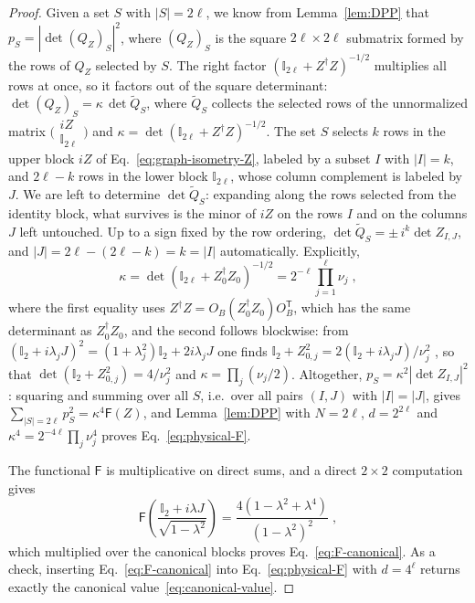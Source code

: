 \documentclass[prx,twocolumn,superscriptaddress,aps,10pt, frontmatterverbose, reprint,footinbib,longbibliography=true]{revtex4-2}
\newcommand{\trans}{\mathsf{T}}
\begin{document}
\begin{proof}
Given a set $S$ with $|S|=2\ell$, we know from Lemma~\ref{lem:DPP} that $p_S=|\det(Q_Z)_S|^2$, where $(Q_Z)_S$ is the square $2\ell\times2\ell$ submatrix formed by the rows of $Q_Z$ selected by $S$. The right factor $(\mathbb{I}_{2\ell}+Z^\dagger Z)^{-1/2}$ multiplies all rows at once, so it factors out of the square determinant: $\det(Q_Z)_S=\kappa\,\det\widetilde{Q}_S$, where $\widetilde{Q}_S$ collects the selected rows of the unnormalized matrix $\big(\begin{smallmatrix}iZ\\ \mathbb{I}_{2\ell}\end{smallmatrix}\big)$ and $\kappa=\det(\mathbb{I}_{2\ell}+Z^\dagger Z)^{-1/2}$. 
The set $S$ selects $k$ rows in the upper block $iZ$ of Eq.~\eqref{eq:graph-isometry-Z}, labeled by a subset $I$ with $|I|=k$, and $2\ell-k$ rows in the lower block $\mathbb{I}_{2\ell}$, whose column complement is labeled by $J$.
We are left to determine $\det\widetilde{Q}_S$: expanding along the rows selected from the identity block, what survives is the minor of $iZ$ on the rows $I$ and on the columns $J$ left untouched. Up to a sign fixed by the row ordering, $\det\widetilde{Q}_S=\pm\,i^k\det Z_{I,J}$, and $|J|=2\ell-(2\ell-k)=k=|I|$ automatically. Explicitly,
\begin{equation}
    \kappa=\det\!\left(\mathbb{I}_{2\ell}+Z_0^\dagger Z_0\right)^{-1/2}=2^{-\ell}\prod_{j=1}^{\ell}\nu_j\;,
    \label{eq:kappa}
\end{equation}
where the first equality uses $Z^\dagger Z=O_B(Z_0^\dagger Z_0)O_B^{\trans}$, which has the same determinant as $Z_0^\dagger Z_0$, and the second follows blockwise: from $(\mathbb{I}_2+i\lambda_jJ)^2=(1+\lambda_j^2)\mathbb{I}_2+2i\lambda_jJ$ one finds $\mathbb{I}_2+Z_{0,j}^2=2(\mathbb{I}_2+i\lambda_jJ)/\nu_j^2$ , so that $\det(\mathbb{I}_2+Z_{0,j}^2)=4/\nu_j^2$ and $\kappa=\prod_{j}(\nu_j/2)$. Altogether, $p_S=\kappa^2|\det Z_{I,J}|^2$: squaring and summing over all $S$, i.e.\ over all pairs $(I,J)$ with $|I|=|J|$, gives $\sum_{|S|=2\ell}p_S^2=\kappa^4\mathsf{F}(Z)$, and Lemma~\ref{lem:DPP} with $N=2\ell$, $d=2^{2\ell}$ and $\kappa^4=2^{-4\ell}\prod_j\nu_j^4$ proves Eq.~\eqref{eq:physical-F}.

The functional $\mathsf{F}$ is multiplicative on direct sums, and a direct $2\times2$ computation gives
\begin{equation}
    \mathsf{F}\!\left(\frac{\mathbb{I}_2+i\lambda J}{\sqrt{1-\lambda^2}}\right)=\frac{4\left(1-\lambda^2+\lambda^4\right)}{(1-\lambda^2)^2}\;,
    \label{eq:F_Z_0}
\end{equation}
which multiplied over the canonical blocks proves Eq.~\eqref{eq:F-canonical}. As a check, inserting Eq.~\eqref{eq:F-canonical} into Eq.~\eqref{eq:physical-F} with $d=4^{\ell}$ returns exactly the canonical value~\eqref{eq:canonical-value}.
\end{proof}
\end{document}

